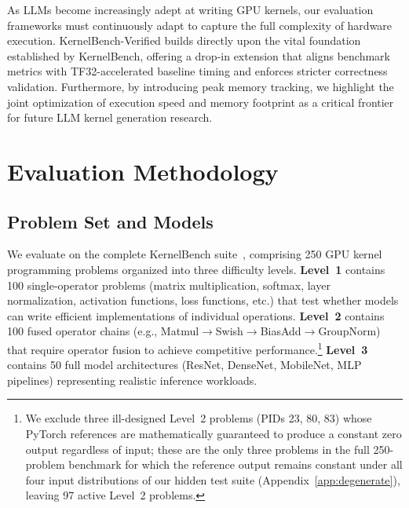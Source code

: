 \documentclass[]{fairmeta}
\begin{document}
As LLMs become increasingly adept at writing GPU kernels, our evaluation frameworks must continuously adapt to capture the full complexity of hardware execution. KernelBench-Verified builds directly upon the vital foundation established by KernelBench, offering a drop-in extension that aligns benchmark metrics with TF32-accelerated baseline timing and enforces stricter correctness validation. Furthermore, by introducing peak memory tracking, we highlight the joint optimization of execution speed and memory footprint as a critical frontier for future LLM kernel generation research.


\section{Evaluation Methodology}
\label{sec:design}

\subsection{Problem Set and Models}

We evaluate on the complete KernelBench suite~\citep{kernelbench}, comprising 250 GPU kernel programming problems organized into three difficulty levels. \textbf{Level~1} contains 100 single-operator problems (matrix multiplication, softmax, layer normalization, activation functions, loss functions, etc.) that test whether models can write efficient implementations of individual operations. \textbf{Level~2} contains 100 fused operator chains (e.g., Matmul$\to$Swish$\to$BiasAdd$\to$GroupNorm) that require operator fusion to achieve competitive performance.\footnote{We exclude three ill-designed Level~2 problems (PIDs 23, 80, 83) whose PyTorch references are mathematically guaranteed to produce a constant zero output regardless of input; these are the only three problems in the full 250-problem benchmark for which the reference output remains constant under all four input distributions of our hidden test suite (Appendix~\ref{app:degenerate}), leaving 97 active Level~2 problems.} \textbf{Level~3} contains 50 full model architectures (ResNet, DenseNet, MobileNet, MLP pipelines) representing realistic inference workloads.
\end{document}

